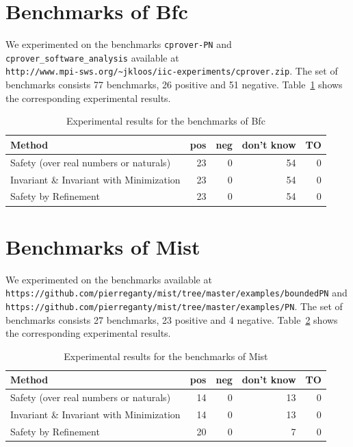 \documentclass{article}
\newcommand{\bfc}{{\sc Bfc}}
\newcommand{\mist}{{\sc Mist}}
\newcommand{\ttt}[1]{\texttt{#1}}
\begin{document}
\newpage
\section{Benchmarks of \bfc}

We experimented on the benchmarks \ttt{cprover-PN} and
\ttt{cprover\_software\_analysis} available at \\
\ttt{http://www.mpi-sws.org/\~{}jkloos/iic-experiments/cprover.zip}.
The set of benchmarks consists 77 benchmarks, 26 positive and 51 negative.
Table~\ref{bfc-experiments} shows the corresponding experimental results.

\begin{table}[h]
\begin{center}
  \begin{tabular}{ | p{7cm} | r | r | r | r | } %
    \hline
    Method & pos & neg & don't know & TO \\
    \hline
    Safety (over real numbers or naturals)      & 23 &  0 & 54 &  0 \\
    Invariant \& Invariant with Minimization    & 23 &  0 & 54 &  0 \\
    Safety by Refinement                        & 23 &  0 & 54 &  0 \\
    \hline
  \end{tabular}
\end{center}
\caption{Experimental results for the benchmarks of \bfc}
\label{bfc-experiments}
\end{table}

\section{Benchmarks of \mist}

We experimented on the benchmarks available at \\
\ttt{https://github.com/pierreganty/mist/tree/master/examples/boundedPN}
and \\
\ttt{https://github.com/pierreganty/mist/tree/master/examples/PN}.
The set of benchmarks consists 27 benchmarks, 23 positive and 4 negative.
Table~\ref{mist-experiments} shows the corresponding experimental results.

\begin{table}[h]
\begin{center}
  \begin{tabular}{ | p{6cm} | r | r | r | r | }
    \hline
    Method & pos & neg & don't know & TO \\
    \hline
    Safety (over real numbers or naturals)      & 14 &  0 & 13 &  0 \\
    Invariant \& Invariant with Minimization    & 14 &  0 & 13 &  0 \\
    Safety by Refinement                        & 20 &  0 &  7 &  0 \\
    \hline
  \end{tabular}
\end{center}
\caption{Experimental results for the benchmarks of \mist}
\label{mist-experiments}
\end{table}
\end{document}
